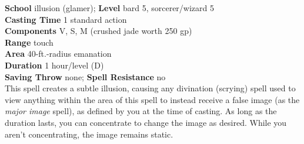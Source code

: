 \textbf{School} illusion (glamer); \textbf{Level} bard 5, sorcerer/wizard 5\\
\textbf{Casting Time} 1 standard action\\
\textbf{Components} V, S, M (crushed jade worth 250 gp)\\
\textbf{Range} touch\\
\textbf{Area} 40-ft.-radius emanation\\
\textbf{Duration} 1 hour/level (D)\\
\textbf{Saving Throw} none; \textbf{Spell Resistance} no\\
This spell creates a subtle illusion, causing any divination (scrying) spell used to view anything within the area of this spell to instead receive a false image (as the \textit{major image }spell), as defined by you at the time of casting. As long as the duration lasts, you can concentrate to change the image as desired. While you aren't concentrating, the image remains static.\\
